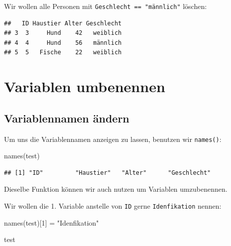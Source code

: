 \documentclass[
]{book}
\newenvironment{Shaded}{\begin{snugshade}}{\end{snugshade}}
\newcommand{\CommentTok}[1]{\textcolor[rgb]{0.56,0.35,0.01}{\textit{#1}}}
\newcommand{\DecValTok}[1]{\textcolor[rgb]{0.00,0.00,0.81}{#1}}
\newcommand{\FunctionTok}[1]{\textcolor[rgb]{0.00,0.00,0.00}{#1}}
\newcommand{\NormalTok}[1]{#1}
\newcommand{\OtherTok}[1]{\textcolor[rgb]{0.56,0.35,0.01}{#1}}
\newcommand{\SpecialCharTok}[1]{\textcolor[rgb]{0.00,0.00,0.00}{#1}}
\newcommand{\StringTok}[1]{\textcolor[rgb]{0.31,0.60,0.02}{#1}}
\begin{document}
Wir wollen alle Personen mit \texttt{Geschlecht\ ==\ "männlich"} löschen:

\begin{Shaded}
\end{Shaded}

\begin{verbatim}
##   ID Haustier Alter Geschlecht
## 3  3     Hund    42   weiblich
## 4  4     Hund    56   männlich
## 5  5   Fische    22   weiblich
\end{verbatim}

\hypertarget{variablen-umbenennen}{%
\section{Variablen umbenennen}\label{variablen-umbenennen}}

\hypertarget{variablennamen-uxe4ndern}{%
\subsection{Variablennamen ändern}\label{variablennamen-uxe4ndern}}

Um uns die Variablennamen anzeigen zu lassen, benutzen wir \texttt{names()}:

\begin{Shaded}
\begin{Highlighting}[]
\FunctionTok{names}\NormalTok{(test)}
\end{Highlighting}
\end{Shaded}

\begin{verbatim}
## [1] "ID"         "Haustier"   "Alter"      "Geschlecht"
\end{verbatim}

Dieselbe Funktion können wir auch nutzen um Variablen umzubenennen.

Wir wollen die 1. Variable anstelle von \texttt{ID} gerne \texttt{Idenfikation} nennen:

\begin{Shaded}
\begin{Highlighting}[]
\FunctionTok{names}\NormalTok{(test)[}\DecValTok{1}\NormalTok{] }\OtherTok{=} \StringTok{"Idenfikation"}

\NormalTok{test}
\end{Highlighting}
\end{Shaded}
\end{document}
